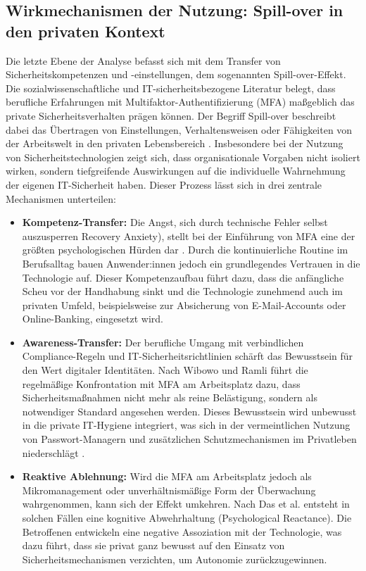 \subsection{Wirkmechanismen der Nutzung: Spill-over in den privaten Kontext}
Die letzte Ebene der Analyse befasst sich mit dem Transfer von Sicherheitskompetenzen und -einstellungen, dem sogenannten {Spill-over-Effekt}. Die sozialwissenschaftliche und IT-sicherheitsbezogene Literatur belegt, dass berufliche Erfahrungen mit Multifaktor-Authentifizierung (MFA) maßgeblich das private Sicherheitsverhalten prägen können. Der Begriff Spill-over beschreibt dabei das Übertragen von Einstellungen, Verhaltensweisen oder Fähigkeiten von der Arbeitswelt in den privaten Lebensbereich \cite[S. 44]{Mark2022}. Insbesondere bei der Nutzung von Sicherheitstechnologien zeigt sich, dass organisationale Vorgaben nicht isoliert wirken, sondern tiefgreifende Auswirkungen auf die individuelle Wahrnehmung der eigenen IT-Sicherheit haben. Dieser Prozess lässt sich in drei zentrale Mechanismen unterteilen:

\begin{itemize}
    \item \textbf{Kompetenz-Transfer:} Die Angst, sich durch technische Fehler selbst auszusperren Recovery Anxiety), stellt bei der Einführung von MFA eine der größten psychologischen Hürden dar \cite[S. 15]{Colnago2018}. Durch die kontinuierliche Routine im Berufsalltag bauen Anwender:innen jedoch ein grundlegendes Vertrauen in die Technologie auf. Dieser Kompetenzaufbau führt dazu, dass die anfängliche Scheu vor der Handhabung sinkt und die Technologie zunehmend auch im privaten Umfeld, beispielsweise zur Absicherung von E-Mail-Accounts oder Online-Banking, eingesetzt wird.
    \item \textbf{Awareness-Transfer:} Der berufliche Umgang mit verbindlichen Compliance-Regeln und IT-Sicherheitsrichtlinien schärft das Bewusstsein für den Wert digitaler Identitäten. Nach Wibowo und Ramli \cite[S. 6]{Wibowo2022} führt die regelmäßige Konfrontation mit MFA am Arbeitsplatz dazu, dass Sicherheitsmaßnahmen nicht mehr als reine Belästigung, sondern als notwendiger Standard angesehen werden. Dieses Bewusstsein wird unbewusst in die private IT-Hygiene integriert, was sich in der vermeintlichen Nutzung von Passwort-Managern und zusätzlichen Schutzmechanismen im Privatleben niederschlägt \cite[S. 129]{Vance2020}.
    \item \textbf{Reaktive Ablehnung:} Wird die MFA am Arbeitsplatz jedoch als Mikromanagement oder unverhältnismäßige Form der Überwachung wahrgenommen, kann sich der Effekt umkehren. Nach Das et al. \cite[S. 15]{Das2021} entsteht in solchen Fällen eine kognitive Abwehrhaltung ({Psychological Reactance}). Die Betroffenen entwickeln eine negative Assoziation mit der Technologie, was dazu führt, dass sie privat ganz bewusst auf den Einsatz von Sicherheitsmechanismen verzichten, um Autonomie zurückzugewinnen.
\end{itemize}


